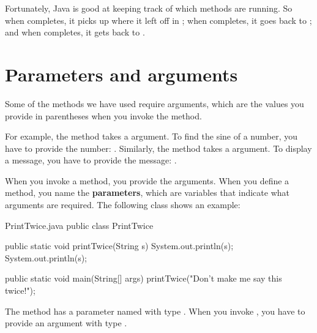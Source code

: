 Fortunately, Java is good at keeping track of which methods are running.
So when  completes, it picks up where it left off in ; when  completes, it goes back to ; and when  completes, it gets back to .




\section{Parameters and arguments}

Some of the methods we have used require arguments, which are the values you provide in parentheses when you invoke the method.

For example, the  method takes a  argument.
To find the sine of a number, you have to provide the number: .
Similarly, the  method takes a  argument.
To display a message, you have to provide the message: .


When you invoke a method, you provide the arguments.
When you define a method, you name the {\bf parameters}, which are variables that indicate what arguments are required.
The following class shows an example:

\begin{trinket}[295]{PrintTwice.java}
public class PrintTwice {

    public static void printTwice(String s) {
        System.out.println(s);
        System.out.println(s);
    }

    public static void main(String[] args) {
        printTwice("Don't make me say this twice!");
    }
}
\end{trinket}

The  method has a parameter named  with type .
When you invoke , you have to provide an argument with type .

